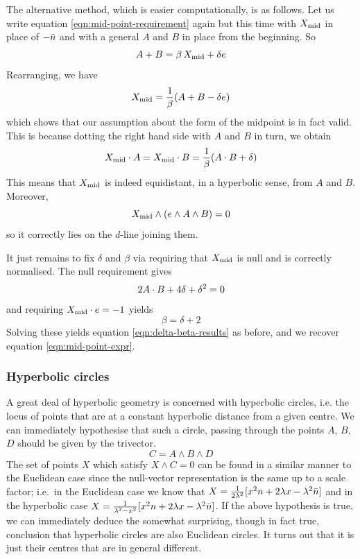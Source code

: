The alternative method, which is easier computationally, is as
follows. Let us write equation \ref{eqn:mid-point-requirement}
again but this time with $X_{\rm mid}$ in place of $-\bar{n}$ and with
a general $A$ and $B$ in place from the beginning. So
%
\begin{equation}
A+B = \beta \, X_{\rm mid} + \delta e
\end{equation}
%
Rearranging, we have
%
\begin{equation}
X_{\rm mid} = \frac{1}{\beta} (A+B-\delta e)
\end{equation}
%
which shows that our assumption about the form of the
midpoint is in fact valid. This is because dotting the
right hand side with $A$ and $B$ in turn, we obtain
%
\begin{equation}
X_{\rm mid} \cdot A = X_{\rm mid} \cdot B = \frac{1}{\beta}
(A\cdot B+\delta)
\end{equation}
%
This means that $X_{\rm mid}$ is indeed equidistant, in a
hyperbolic sense, from $A$ and $B$. Moreover,
%
\begin{equation}
X_{\rm mid} \wedge (e \wedge A \wedge B) = 0
\end{equation}
%
so it correctly lies on the $d$-line joining them.

It just remains to fix $\delta$ and $\beta$ via requiring
that $X_{\rm mid}$ is null and is correctly normalised.
The null requirement gives
%
\begin{equation}
2 A \cdot B + 4 \delta + \delta^2 = 0
\end{equation}
%
and requiring $X_{\rm mid} \cdot e = -1$ yields
%
\begin{equation}
\beta=\delta+2
\end{equation}
%
Solving these yields equation \ref{eqn:delta-beta-results} as
before, and we recover equation \ref{eqn:mid-point-expr}.

\subsubsection{Hyperbolic circles}

A great deal of hyperbolic geometry is concerned with
hyperbolic circles, i.e. the locus of points that are
at a constant hyperbolic distance from a given centre.
We can immediately hypothesise that such a circle,
passing through the points $A$, $B$, $D$  should be given
by the trivector.
%
\begin{equation}
C = A \wedge B \wedge D
\end{equation}
%
The set of points $X$ which satisfy $X\wedge C=0$ can be found
in a similar manner to the Euclidean case since the null-vector
representation is the same up to a scale factor; 
i.e.\ in the Euclidean case we know that $X =
\frac{1}{2\lambda^2}[x^2n + 2\lambda x - \lambda^2\bar{n}]$ and in the
hyperbolic case $X = \frac{1}{\lambda^2 - x^2}[x^2n + 2\lambda
x - \lambda^2\bar{n}]$.
If the above hypothesis is true, we can
immediately deduce the somewhat surprising, though in fact true,
conclusion that hyperbolic circles are also Euclidean circles.
It turns out that it is just their centres that are in general
different.

